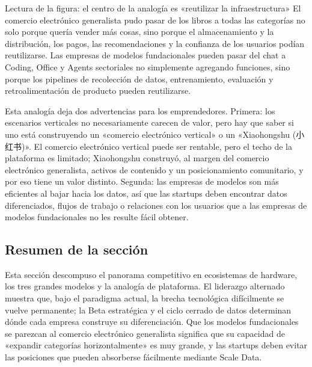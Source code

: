\begin{knowledgebox}{Lectura de la figura: el centro de la analogía es «reutilizar la infraestructura»}
El comercio electrónico generalista pudo pasar de los libros a todas las categorías no solo porque quería vender más cosas, sino porque el almacenamiento y la distribución, los pagos, las recomendaciones y la confianza de los usuarios podían reutilizarse. Las empresas de modelos fundacionales pueden pasar del chat a Coding, Office y Agents sectoriales no simplemente agregando funciones, sino porque los pipelines de recolección de datos, entrenamiento, evaluación y retroalimentación de producto pueden reutilizarse.
\end{knowledgebox}

Esta analogía deja dos advertencias para los emprendedores. Primera: los escenarios verticales no necesariamente carecen de valor, pero hay que saber si uno está construyendo un «comercio electrónico vertical» o un «Xiaohongshu (小红书)». El comercio electrónico vertical puede ser rentable, pero el techo de la plataforma es limitado; Xiaohongshu construyó, al margen del comercio electrónico generalista, activos de contenido y un posicionamiento comunitario, y por eso tiene un valor distinto. Segunda: las empresas de modelos son más eficientes al bajar hacia los datos, así que las startups deben encontrar datos diferenciados, flujos de trabajo o relaciones con los usuarios que a las empresas de modelos fundacionales no les resulte fácil obtener.

\subsection{Resumen de la sección}

Esta sección descompuso el panorama competitivo en ecosistemas de hardware, los tres grandes modelos y la analogía de plataforma. El liderazgo alternado muestra que, bajo el paradigma actual, la brecha tecnológica difícilmente se vuelve permanente; la Beta estratégica y el ciclo cerrado de datos determinan dónde cada empresa construye su diferenciación. Que los modelos fundacionales se parezcan al comercio electrónico generalista significa que su capacidad de «expandir categorías horizontalmente» es muy grande, y las startups deben evitar las posiciones que pueden absorberse fácilmente mediante Scale Data.
